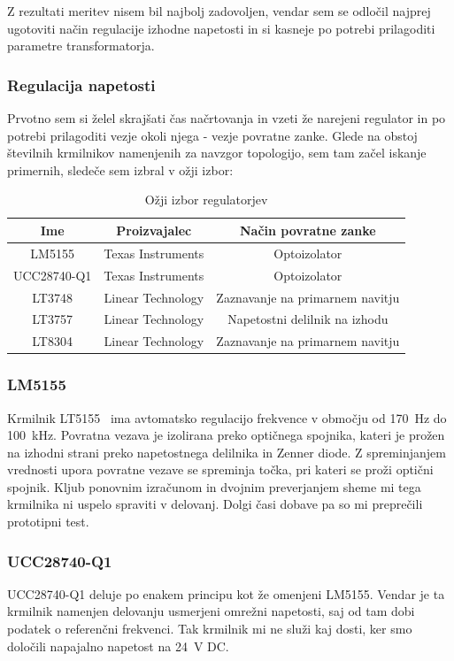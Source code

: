 \documentclass[a4paper,twoside,openright,12pt,Slovene]{book}
\begin{document}
Z rezultati meritev nisem bil najbolj zadovoljen, vendar sem se odločil najprej ugotoviti način regulacije izhodne napetosti in si kasneje po potrebi prilagoditi parametre transformatorja. 

	\subsubsection{Regulacija napetosti} \label{RegulacijaNapetosti}
	Prvotno sem si želel skrajšati čas načrtovanja in vzeti že narejeni regulator in po potrebi prilagoditi vezje okoli njega - vezje povratne zanke. Glede na obstoj številnih krmilnikov namenjenih za navzgor topologijo, sem tam začel iskanje primernih, sledeče sem izbral v ožji izbor:
	
\begin{table}[h!]
\centering
\begin{tabular}{||c | c |c||}
\hline
Ime & Proizvajalec & Način povratne zanke \\[0.5ex]
\hline\hline
LM5155 & Texas Instruments & Optoizolator \\
UCC28740-Q1 & Texas Instruments & Optoizolator \\
LT3748 & Linear Technology & Zaznavanje na primarnem navitju \\
LT3757 & Linear Technology & Napetostni delilnik na izhodu \\
LT8304 & Linear Technology & Zaznavanje na primarnem navitju \\ [1ex]

\hline
\end{tabular}
\caption{Ožji izbor regulatorjev}
\end{table}

	\subsubsection{LM5155} \label{LM5155}
Krmilnik LT5155~\cite{TI:LT5155} ima avtomatsko regulacijo frekvence v območju od \SI{170}{\hertz} do \SI{100}{\kilo\hertz}. Povratna vezava je izolirana preko optičnega spojnika, kateri je prožen na izhodni strani preko napetostnega delilnika in Zenner diode. Z spreminjanjem vrednosti upora povratne vezave se spreminja točka, pri kateri se proži optični spojnik. Kljub ponovnim izračunom in dvojnim preverjanjem sheme mi tega krmilnika ni uspelo spraviti v delovanj. Dolgi časi dobave pa so mi preprečili prototipni test.


	\subsubsection{UCC28740-Q1} \label{UCC28740-Q1}
UCC28740-Q1 deluje po enakem principu kot že omenjeni LM5155. Vendar je ta krmilnik namenjen delovanju usmerjeni omrežni napetosti, saj od tam dobi podatek o referenčni frekvenci. Tak krmilnik mi ne služi kaj dosti, ker smo določili napajalno napetost na \SI{24}{\volt} DC. 
\end{document}
